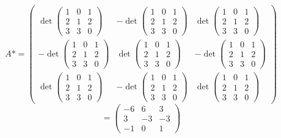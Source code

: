 \documentclass[12pt]{article}
\begin{document}
\[A* =
\begin{pmatrix}
    \det{\begin{pmatrix}
        1 & 0 & 1\\
        2 & 1 & 2\\
        3 & 3 & 0
    \end{pmatrix}} & -\det{\begin{pmatrix}
        1 & 0 & 1\\
        2 & 1 & 2\\
        3 & 3 & 0
    \end{pmatrix}} & \det{\begin{pmatrix}
        1 & 0 & 1\\
        2 & 1 & 2\\
        3 & 3 & 0
    \end{pmatrix}}\\
    -\det{\begin{pmatrix}
        1 & 0 & 1\\
        2 & 1 & 2\\
        3 & 3 & 0
    \end{pmatrix}} &
    \det{\begin{pmatrix}
        1 & 0 & 1\\
        2 & 1 & 2\\
        3 & 3 & 0
    \end{pmatrix}} &
    -\det{\begin{pmatrix}
        1 & 0 & 1\\
        2 & 1 & 2\\
        3 & 3 & 0
    \end{pmatrix}}\\
    \det{\begin{pmatrix}
        1 & 0 & 1\\
        2 & 1 & 2\\
        3 & 3 & 0
    \end{pmatrix}} &
    -\det{\begin{pmatrix}
        1 & 0 & 1\\
        2 & 1 & 2\\
        3 & 3 & 0
    \end{pmatrix}} &
    \det{\begin{pmatrix}
        1 & 0 & 1\\
        2 & 1 & 2\\
        3 & 3 & 0
    \end{pmatrix}}
\end{pmatrix}
\]
\[= \begin{pmatrix}
    -6 & 6 & 3\\
    3 & -3 & -3\\
    -1 & 0 & 1
\end{pmatrix}\]
\end{document}
